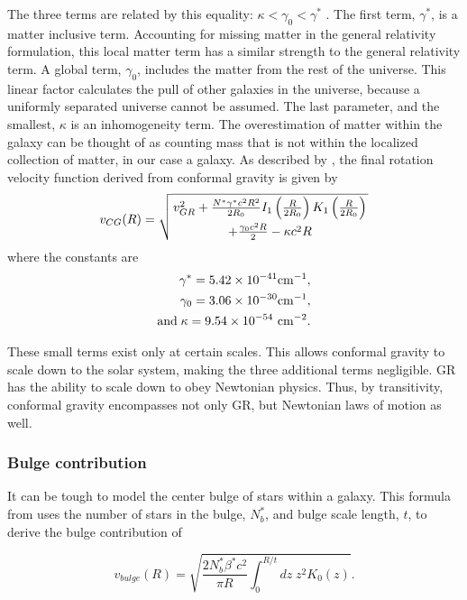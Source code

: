\documentclass[conference]{IEEEtran}
\providecommand{\e}[1]{\ensuremath{\times 10^{#1}}}
\begin{document}
The three terms are related by this equality: $\kappa < \gamma_0 < \gamma^*$ \cite{mannheim}. The first term, $\gamma^*$, is a matter inclusive term. Accounting for missing matter in the general relativity formulation, this local matter term has a similar strength to the general relativity term. A global term, $\gamma_0$, includes the matter from the rest of the universe. This linear factor calculates the pull of other galaxies in the universe, because a uniformly separated universe cannot be assumed. The last parameter, and the smallest, $\kappa$ is an inhomogeneity term. The overestimation of matter within the galaxy can be thought of as counting mass that is not within the localized collection of matter, in our case a galaxy. As described by \cite{mannheim}, the final rotation velocity function derived from conformal gravity is given by
\begin{equation}
v_{CG}(R) = \sqrt{\genfrac{}{}{0pt}{}{v_{GR}^2+\frac{N^*\gamma^*c^2R^2}{2R_0}I_1\left(\frac{R}{2R_0}\right)K_1\left(\frac{R}{2R_0}\right)}{+\frac{\gamma_0c^2R}{2}-\kappa c^2R}}
\end{equation}
where the constants are
\begin{equation*}
\begin{split}
\gamma^*=5.42\e{-41} {\rm cm}^{-1}, \\ 
\gamma_0=3.06\e{-30} {\rm cm}^{-1}, \\ 
\text{and}\; \kappa=9.54\e{-54}~{\rm cm}^{-2}.
\end{split}
\end{equation*} 

These small terms exist only at certain scales. This allows conformal gravity to scale down to the solar system, making the three additional terms negligible. GR has the ability to scale down to obey Newtonian physics. Thus, by transitivity, conformal gravity encompasses not only GR, but Newtonian laws of motion as well.

\subsubsection{Bulge contribution}

It can be tough to model the center bulge of stars within a galaxy. This formula from \cite{mannheim} uses the number of stars in the bulge, $N^*_b$, and bulge scale length, $t$, to derive the bulge contribution of

\begin{equation}
v_{bulge}(R) = \sqrt{\frac{2 N^*_b\beta^* c^2}{\pi R} \int_0^{R/t} dz\; z^2K_0(z)}.
\end{equation}
\end{document}
